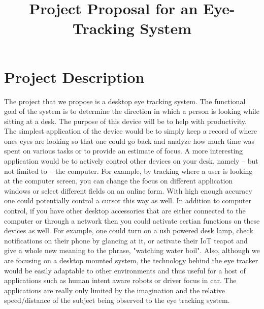 \documentclass[12pt,conference,onecolumn]{IEEEtran}
\begin{document}
\title{Project Proposal for an Eye-Tracking System}
\author{
	\and
	\and
}

\maketitle
\IEEEpeerreviewmaketitle


\section{Project Description} \label{sec:proj_desc}
The project that we propose is a desktop eye tracking system. The functional goal of the system is to determine the direction in which a person is looking while sitting at a desk. The purpose of this device will be to help with productivity. The simplest application of the device would be to simply keep a record of where ones eyes are looking so that one could go back and analyze how much time was spent on various tasks or to provide an estimate of focus. A more interesting application would be to actively control other devices on your desk, namely -- but not limited to -- the computer. For example, by tracking where a user is looking at the computer screen, you can change the focus on different application windows or select different fields on an online form. With high enough accuracy one could potentially control a cursor this way as well. In addition to computer control, if you have other desktop accessories that are either connected to the computer or through a network then you could activate certian functions on these devices as well. For example, one could turn on a usb powered desk lamp, check notifications on their phone by glancing at it, or activate their IoT teapot and give a whole new meaning to the phrase, "watching water boil". Also, although we are focusing on a desktop mounted system, the technology behind the eye tracker would be easily adaptable to other environments and thus useful for a host of applications such as human intent aware robots or driver focus in car. The applications are really only limited by the imagination and the relative speed/distance of the subject being observed to the eye tracking system.
\end{document}
